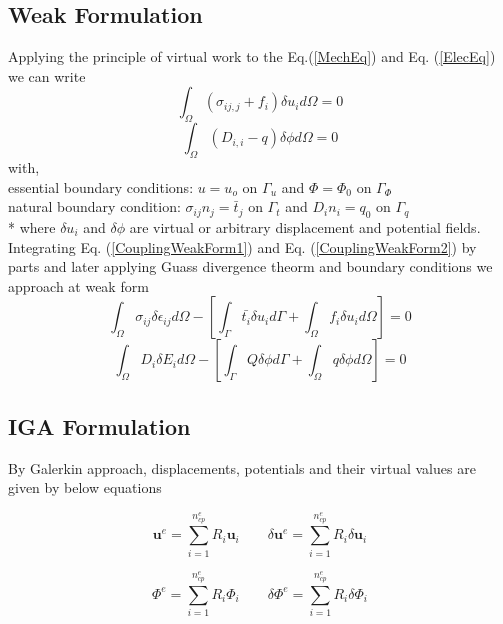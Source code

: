 \documentclass[11pt]{article}
\begin{document}
\subsection{Weak Formulation}
Applying the principle of virtual work to the Eq.(\ref{MechEq})
and Eq. (\ref{ElecEq}) we can write
\begin{equation} \label{CouplingWeakForm1}
\int_\Omega ( \sigma_{ij,j} + f_i ) \delta u_i d\Omega = 0  
\end{equation}
\begin{equation} \label{CouplingWeakForm2}
\int_\Omega (D_{i,i} - q ) \delta \phi d\Omega = 0
\end{equation}
with, \\
essential boundary conditions:
$u = u_o$ on $\Gamma_u$ and $\Phi=\Phi_0$ on $\Gamma_\Phi$ \\
natural boundary condition:
$\sigma_{ij}n_j = \bar{t}_j$ on $\Gamma_t$ and $D_i n_i = q_0$ on $\Gamma_q$ \\*
where $\delta u_i$ and $\delta \phi$ are virtual or arbitrary displacement and
potential fields. \\
Integrating Eq. (\ref{CouplingWeakForm1}) and Eq. (\ref{CouplingWeakForm2}) by
parts and later applying Guass divergence theorm and boundary conditions we
approach at weak form
\begin{equation} \label{FinalCouplingWeakForm1}
\int_\Omega \sigma_{ij} \delta \epsilon_{ij} d\Omega - \left[ \int_{\Gamma}
\bar{t_i} \delta u_i d\Gamma + \int_\Omega f_i \delta u_i d\Omega  \right]= 0 
\end{equation}
\begin{equation} \label{FinalCouplingWeakForm2}
\int_\Omega D_i \delta E_i d\Omega - \left[ \int_{\Gamma} Q \delta \phi d\Gamma
+ \int_\Omega q \delta \phi d\Omega \right] = 0
\end{equation}


\subsection{IGA Formulation}
By Galerkin approach, displacements, potentials and their virtual values are
given by below equations

\begin{equation} \label{u_and_du_2}
\textbf{u}^e = \sum_{i=1}^{n_{cp}^e} R_i \textbf{u}_i \qquad \delta\textbf{u}^e
= \sum_{i=1}^{n_{cp}^e} R_i \delta\textbf{u}_i
\end{equation}

\begin{equation} \label{Phi_and_dPhi_2}
\Phi^e = \sum_{i=1}^{n_{cp}^e} R_i \Phi_i \qquad \delta\Phi^e =
\sum_{i=1}^{n_{cp}^e} R_i \delta\Phi_i
\end{equation}
\end{document}
